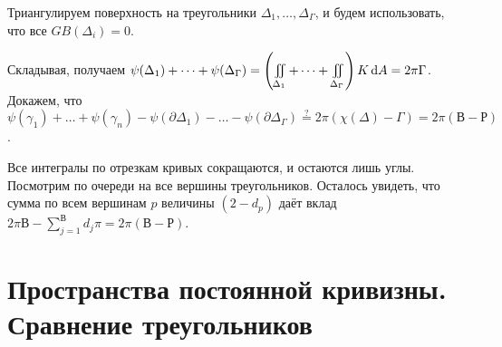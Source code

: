 \documentclass[a4paper]{report}
\begin{document}
{{    Триангулируем поверхность на треугольники $\Delta_1, \dots, \Delta_\Gamma$, и будем использовать, что все $GB(\Delta_i) = 0$.

    Складывая, получаем $\psi(\Delta_1) + \dots + \psi(\Delta_\Gamma) = \left(\iint\limits_{\Delta_1} + \dots + \iint\limits_{\Delta_\Gamma}\right)K\operatorname{d}\! A = 2\pi \Gamma$.
    Докажем, что $\psi(\gamma_1) + \dots + \psi(\gamma_n) - \psi(\partial \Delta_1) - \dots - \psi(\partial \Delta_\Gamma) \overset{?}= 2\pi(\chi(\Delta) - \Gamma) = 2\pi(\text{В} - \text{Р})$.

    Все интегралы по отрезкам кривых сокращаются, и остаются лишь углы.
        Посмотрим по очереди на все вершины треугольников.
    Осталось увидеть, что сумма по всем вершинам $p$ величины $(2 - d_p)$ даёт вклад $2\pi\text{В} - \sum\limits_{j = 1}^{\text{В}}d_j \pi = 2\pi(\text{В} - \text{Р})$.
    }
    }
    \section{Пространства постоянной кривизны. Сравнение треугольников}
\end{document}

